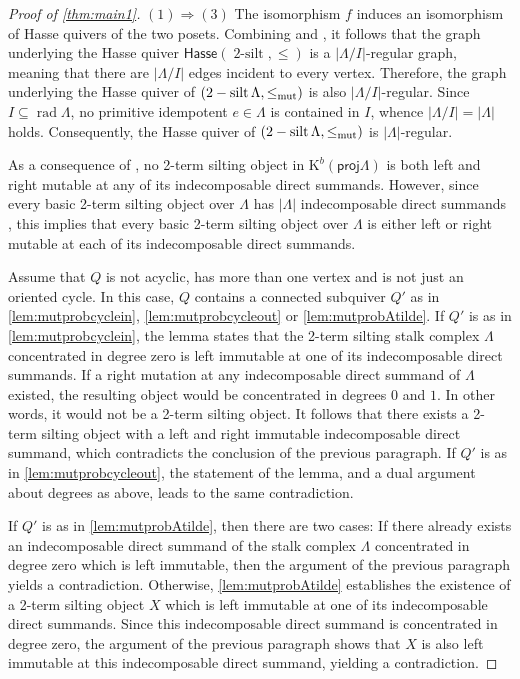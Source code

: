 \documentclass[11pt]{amsart}
\newcommand{\proj}{\mathsf{proj}}
\newcommand{\Hasse}{\mathsf{Hasse}}
\DeclareMathOperator{\rad}{\mathrm{rad}}
\DeclareMathOperator{\twosilt}{\mathrm{2-silt}}
\theoremstyle{definition}
\begin{document}
\begin{proof}[Proof of \cref{thm:main1}]
    $(1) \Rightarrow (3)$ The isomorphism $f$ induces an isomorphism of Hasse quivers of the two posets. Combining \cite[Cor. 4.6]{dirrt} and \cite[Cor. 2.34, Cor. 3.9]{tau}, it follows that the graph underlying the Hasse quiver $\Hasse(\twosilt, \leq)$ is a $|\Lambda/I|$-regular graph, meaning that there are $|\Lambda/I|$ edges incident to every vertex. Therefore, the graph underlying the Hasse quiver of $(\twosilt \Lambda, \leq_{\textnormal{mut}})$ is also $|\Lambda/I|$-regular. Since $I \subseteq \rad \Lambda$, no primitive idempotent $e \in \Lambda$ is contained in $I$, whence $|\Lambda/I| = |\Lambda|$ holds. Consequently, the Hasse quiver of $(\twosilt \Lambda, \leq_{\textnormal{mut}})$ is $|\Lambda|$-regular. 
    
    As a consequence of \cite[Lem. 2.12]{Kimura2024}, no 2-term silting object in $\mathrm{K}^b(\proj \Lambda)$ is both left and right mutable at any of its indecomposable direct summands. However, since every basic 2-term silting object over $\Lambda$ has $|\Lambda|$ indecomposable direct summands \cite[Thm. 2.27, Cor. 2.28]{Aihara_2012}, this implies that every basic 2-term silting object over $\Lambda$ is either left or right mutable at each of its indecomposable direct summands.
    
    Assume that $Q$ is not acyclic, has more than one vertex and is not just an oriented cycle. In this case, $Q$ contains a connected subquiver $Q'$ as in \cref{lem:mutprobcyclein}, \cref{lem:mutprobcycleout} or \cref{lem:mutprobAtilde}. If $Q'$ is as in \cref{lem:mutprobcyclein}, the lemma states that the 2-term silting stalk complex $\Lambda$ concentrated in degree zero is left immutable at one of its indecomposable direct summands. If a right mutation at any indecomposable direct summand of $\Lambda$ existed, the resulting object would be concentrated in degrees $0$ and $1$. In other words, it would not be a 2-term silting object. It follows that there exists a 2-term silting object with a left and right immutable indecomposable direct summand, which contradicts the conclusion of the previous paragraph. If $Q'$ is as in \cref{lem:mutprobcycleout}, the statement of the lemma, and a dual argument about degrees as above, leads to the same contradiction. 
    
     If $Q'$ is as in \cref{lem:mutprobAtilde}, then there are two cases: If there already exists an indecomposable direct summand of the stalk complex $\Lambda$ concentrated in degree zero which is left immutable, then the argument of the previous paragraph yields a contradiction. Otherwise, \cref{lem:mutprobAtilde} establishes the existence of a 2-term silting object $X$ which is left immutable at one of its indecomposable direct summands. Since this indecomposable direct summand is concentrated in degree zero, the argument of the previous paragraph shows that $X$ is also left immutable at this indecomposable direct summand, yielding a contradiction.
     

\end{proof}
\end{document}
